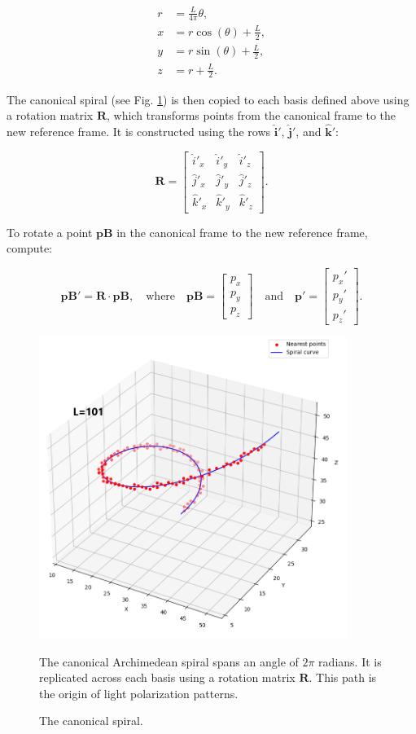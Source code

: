 \documentclass[12pt]{article}
\begin{document}
\begin{align}
r &= \frac{L}{4\pi} \theta, \\
x &= r \cos(\theta) + \frac{L}{2}, \\
y &= r \sin(\theta) + \frac{L}{2}, \\
z &= r + \frac{L}{2}.
\end{align}

The canonical spiral (see Fig. \ref{fig3}) is then copied to each basis defined above using a rotation matrix $\mathbf{R}$, which transforms points from the canonical frame to the new reference frame. It is constructed using the rows $\hat{\mathbf{i}}'$, $\hat{\mathbf{j}}'$, and $\hat{\mathbf{k}}'$:

\[
\mathbf{R} = 
\begin{bmatrix}
    \hat{i}'_x & \hat{i}'_y & \hat{i}'_z \\
    \hat{j}'_x & \hat{j}'_y & \hat{j}'_z \\
    \hat{k}'_x & \hat{k}'_y & \hat{k}'_z
\end{bmatrix}.
\]

To rotate a point $\mathbf{pB}$ in the canonical frame to the new reference frame, compute:

\[
\mathbf{pB}' = \mathbf{R} \cdot \mathbf{pB}, \quad
\text{where} \quad
\mathbf{pB} =
\begin{bmatrix} p_x \\ p_y \\ p_z \end{bmatrix}
\quad \text{and} \quad
\mathbf{p}' =
\begin{bmatrix} p_x' \\ p_y' \\ p_z' \end{bmatrix}.
\]

\begin{figure}
\centering
\includegraphics[width=10cm]{fig3}
\caption{The canonical spiral.}
\footnotesize{The canonical Archimedean spiral spans an angle of \(2\pi\) radians. It is replicated across each basis using a rotation matrix \( \mathbf{R} \). This path is the origin of light polarization patterns.}
\label{fig3}
\end{figure}
\end{document}
